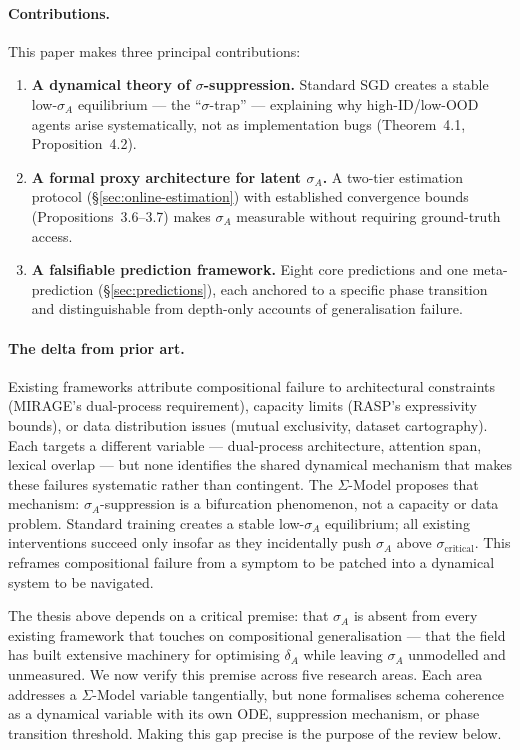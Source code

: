 \documentclass[10pt]{article}
\begin{document}
\paragraph*{Contributions.}
This paper makes three principal contributions:
\begin{enumerate}[nosep]
\item \textbf{A dynamical theory of $\sigma$-suppression.}
  Standard SGD creates a stable low-$\sigma_A$ equilibrium --- the
  ``$\sigma$-trap'' --- explaining why high-ID/low-OOD agents arise
  systematically, not as implementation bugs
  (Theorem~4.1, Proposition~4.2).
\item \textbf{A formal proxy architecture for latent $\sigma_A$.}
  A two-tier estimation protocol (\S\ref{sec:online-estimation}) with
  established convergence bounds (Propositions~3.6--3.7) makes $\sigma_A$
  measurable without requiring ground-truth access.
\item \textbf{A falsifiable prediction framework.}
  Eight core predictions and one meta-prediction (\S\ref{sec:predictions}),
  each anchored to a specific phase transition and distinguishable from
  depth-only accounts of generalisation failure.
\end{enumerate}

\paragraph{The delta from prior art.}
Existing frameworks attribute compositional failure to architectural
constraints (MIRAGE's dual-process requirement), capacity limits
(RASP's expressivity bounds), or data distribution issues (mutual
exclusivity, dataset cartography). Each targets a different variable
--- dual-process architecture, attention span, lexical overlap --- but
none identifies the shared dynamical mechanism that makes these
failures systematic rather than contingent. The $\Sigma$-Model
proposes that mechanism: $\sigma_A$-suppression is a bifurcation
phenomenon, not a capacity or data problem. Standard training creates
a stable low-$\sigma_A$ equilibrium; all existing interventions succeed
only insofar as they incidentally push $\sigma_A$ above
$\sigma_{\text{critical}}$. This reframes compositional failure from a
symptom to be patched into a dynamical system to be navigated.

The thesis above depends on a critical premise: that $\sigma_A$ is
absent from every existing framework that touches on compositional
generalisation --- that the field has built extensive machinery for
optimising $\delta_A$ while leaving $\sigma_A$ unmodelled and
unmeasured. We now verify this premise across five research areas.
Each area addresses a $\Sigma$-Model variable tangentially, but none
formalises schema coherence as a dynamical variable with its own ODE,
suppression mechanism, or phase transition threshold. Making this gap
precise is the purpose of the review below.
\end{document}
